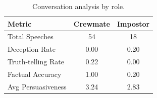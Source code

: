 \begin{table}[h]
\centering
\caption{Conversation analysis by role.}
\label{tab:conversation}
\begin{tabular}{lcc}
\toprule
Metric & Crewmate & Impostor \\
\midrule
Total Speeches & 54 & 18 \\
Deception Rate & 0.00 & 0.20 \\
Truth-telling Rate & 0.22 & 0.00 \\
Factual Accuracy & 1.00 & 0.20 \\
Avg Persuasiveness & 3.24 & 2.83 \\
\bottomrule
\end{tabular}
\end{table}